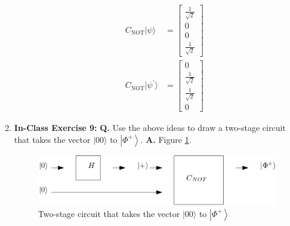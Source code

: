 \documentclass[main.tex]{subfiles}
\begin{document}
\begin{enumerate}
\begin{enumerate}
        \begin{align*}
            C_{\text{NOT}}|\psi\rangle          & =  \left[\begin{array}{l}\frac{1}{\sqrt{2}}\\0\\
                                                0\\\frac{1}{\sqrt{2}}\end{array}\right]\\
            C_{\text{NOT}}|\psi^{\prime}\rangle & = \left[\begin{array}{l}0\\\frac{1}{\sqrt{2}}\\
                                                \frac{1}{\sqrt{2}}\\0\end{array}\right]
        \end{align*}
    \end{enumerate}

\item[] \textbf{In-Class Exercise 9:} \textbf{Q.} Use the above ideas to draw a two-stage circuit that takes the vector $|00\rangle$ to $\left|\Phi^{+}\right\rangle$. \textbf{A.} Figure \ref{fig:two_stage}.
    \begin{figure}
        \centering
        \includegraphics[width=5in]{modules/figs/m05/e09.png}
        \caption{Two-stage circuit that takes the vector $|00\rangle$ to $\left|\Phi^{+}\right\rangle$}
        \label{fig:two_stage}
    \end{figure}


\end{enumerate}
\end{document}
